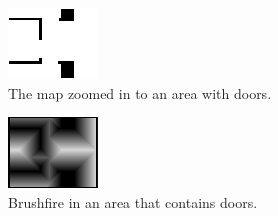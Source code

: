 \begin{figure}[ht]
\centering
  \begin{subfigure}[t]{0.3\textwidth}
    \includegraphics[width = \textwidth]{graphics/doors_in_map}
    \caption{The map zoomed in to an area with doors.}
    \label{doors_in_map}
  \end{subfigure}
  \begin{subfigure}[t]{0.3\textwidth}
    \includegraphics[width = \textwidth]{graphics/brushfire_door}
    \caption{Brushfire in an area that contains doors.}
    \label{brush_door}
  \end{subfigure}
  \begin{subfigure}[t]{0.3\textwidth}

\end{subfigure}
\end{figure}
